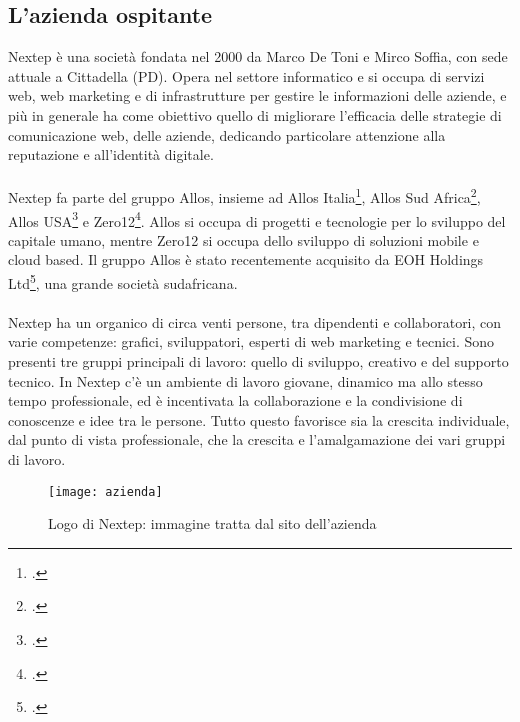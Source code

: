 \subsection{L'azienda ospitante}
Nextep è una società fondata nel 2000 da Marco De Toni e Mirco Soffia, con sede
attuale a Cittadella (PD).
Opera nel settore informatico e si occupa di servizi web, web marketing e di infrastrutture
per gestire le informazioni delle aziende, e più in generale ha come obiettivo
quello di migliorare l’efficacia delle strategie di comunicazione web, delle aziende,
dedicando particolare attenzione alla reputazione e all’identità digitale. \\ \\
Nextep fa parte del gruppo Allos, insieme ad Allos Italia\footcite{https://www.allos.it/}, Allos Sud Africa\footcite{http://www.allos.co.za/}, Allos
USA\footcite{http://www.allosamerica.com/} e Zero12\footcite{http://www.zero12.it/}.
Allos si occupa di progetti e tecnologie per lo sviluppo del capitale umano, mentre
Zero12 si occupa dello sviluppo di soluzioni mobile e cloud based.
Il gruppo Allos è stato recentemente acquisito da EOH Holdings Ltd\footcite{http://www.eoh.co.za/}, una grande
società sudafricana.\\ \\
Nextep ha un organico di circa venti persone, tra dipendenti e collaboratori, con
varie competenze: grafici, sviluppatori, esperti di web marketing e tecnici. Sono presenti
tre gruppi principali di lavoro: quello di sviluppo, creativo e del supporto
tecnico.
In Nextep c’è un ambiente di lavoro giovane, dinamico ma allo stesso tempo professionale,
ed è incentivata la collaborazione e la condivisione di conoscenze e idee
tra le persone. Tutto questo favorisce sia la crescita individuale, dal punto di vista
professionale, che la crescita e l’amalgamazione dei vari gruppi di lavoro.
\begin{figure}[!h] 
	\centering 
	\texttt{[image: azienda]} 
	\caption{Logo di Nextep: immagine tratta dal sito dell’azienda}
\end{figure}
